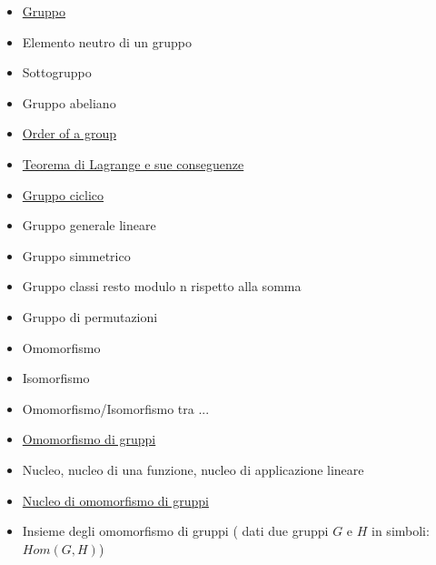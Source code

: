 \documentclass[a4paper,10pt]{article}
\begin{document}
\begin{itemize}
 \item \href{./Gruppo.html}{Gruppo}
 \item Elemento neutro di un gruppo
 \item Sottogruppo
 \item Gruppo abeliano
 \item \href{./OrderOfGroup.html}{Order of a group}
 \item \href{./TeoremaDiLagrange.html}{Teorema di Lagrange e sue conseguenze} 
 \item \href{./CyclicGroup.html}{Gruppo ciclico}
 
 \item Gruppo generale lineare
 \item Gruppo simmetrico 
 \item Gruppo classi resto modulo n rispetto alla somma
 \item Gruppo di permutazioni
 
 \item Omomorfismo
 \item Isomorfismo
 \item Omomorfismo/Isomorfismo tra ...
 \item \href{./OmomorfismoGruppi.html}{Omomorfismo di gruppi}
 \item Nucleo, nucleo di una funzione, nucleo di applicazione lineare
 \item \href{Nucleo.html}{Nucleo di omomorfismo di gruppi}
 \item Insieme degli omomorfismo di gruppi ( dati due gruppi $G$ e $H$ in simboli: $Hom(G,H)$)
 

\end{itemize}
\end{document}
